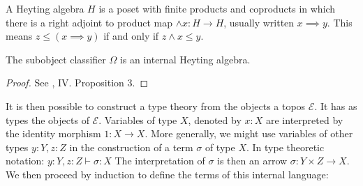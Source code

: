 \begin{definition}
	A Heyting algebra $H$ is a poset with finite products and coproducts in which there is a right adjoint to product map $\land x \colon H \to H$, usually written $x \implies y$. This means $z \le (x \implies y)$ if and only if $z \land x \le y$.
\end{definition}

\begin{theorem}
	The subobject classifier $\Omega$ is an internal Heyting algebra.
\end{theorem}

\begin{proof}
	See \cite{SIGL}, IV. Proposition 3.
\end{proof}

It is then possible to construct a type theory from the objects a topos $\mathcal{E}$. It has as types the objects of $\mathcal{E}$. Variables of type $X$, denoted by $x \colon X$ are interpreted by the identity morphism $1 \colon X \to X$. More generally, we might use variables of other types $y \colon Y, z \colon Z$ in the construction of a term $\sigma$ of type $X$. In type theoretic notation: $y \colon Y, z \colon Z \vdash \sigma \colon X$ The interpretation of $\sigma$ is then an arrow $\sigma \colon Y \times Z \to X$. We then proceed by induction to define the terms of this internal language:

